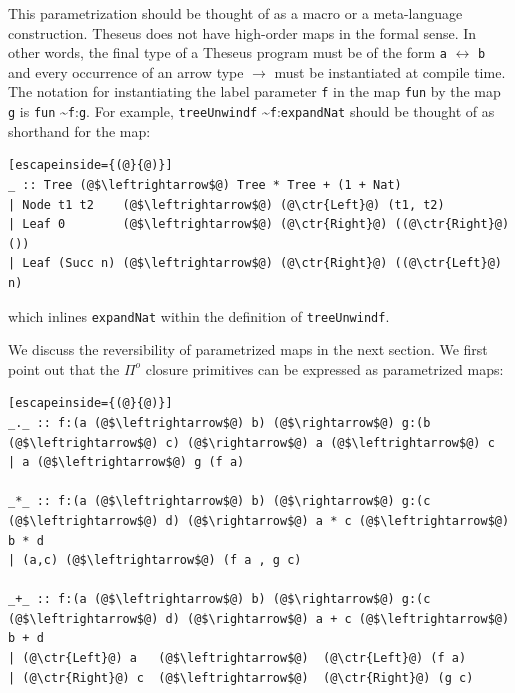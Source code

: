 \documentclass{article}
\newcommand{\ctr}[1]{{\scriptsize{\texttt{#1}}}}
\newcommand{\inline}[3]{\ctr{#1} \textasciitilde \ctr{#2}:\ctr{#3}}
\begin{document}
\noindent This parametrization should be thought of as a macro or a
meta-language construction. Theseus does not have high-order maps in the
formal sense. In other words, the final type of a Theseus program must be of
the form \ctr{a} $\leftrightarrow$ \ctr{b} and every occurrence of an arrow
type $\rightarrow$ must be instantiated at compile time. The notation for
instantiating the label parameter \ctr{f} in the map \ctr{fun} by the map
\ctr{g} is \inline{fun}{f}{g}. For example,
\inline{treeUnwindf}{f}{expandNat} should be thought of as shorthand for the
map:
\begin{lstlisting}[escapeinside={(@}{@)}]
_ :: Tree (@$\leftrightarrow$@) Tree * Tree + (1 + Nat)
| Node t1 t2    (@$\leftrightarrow$@) (@\ctr{Left}@) (t1, t2)
| Leaf 0        (@$\leftrightarrow$@) (@\ctr{Right}@) ((@\ctr{Right}@) ())
| Leaf (Succ n) (@$\leftrightarrow$@) (@\ctr{Right}@) ((@\ctr{Left}@) n)
 \end{lstlisting}

\noindent which inlines \ctr{expandNat} within the definition of
\ctr{treeUnwindf}.

We discuss the reversibility of parametrized maps in the next section. We
first point out that the \ensuremath{\Pi^{o}} closure primitives can be expressed as
parametrized maps:
\begin{lstlisting}[escapeinside={(@}{@)}]
_._ :: f:(a (@$\leftrightarrow$@) b) (@$\rightarrow$@) g:(b (@$\leftrightarrow$@) c) (@$\rightarrow$@) a (@$\leftrightarrow$@) c
| a (@$\leftrightarrow$@) g (f a)

_*_ :: f:(a (@$\leftrightarrow$@) b) (@$\rightarrow$@) g:(c (@$\leftrightarrow$@) d) (@$\rightarrow$@) a * c (@$\leftrightarrow$@) b * d
| (a,c) (@$\leftrightarrow$@) (f a , g c)

_+_ :: f:(a (@$\leftrightarrow$@) b) (@$\rightarrow$@) g:(c (@$\leftrightarrow$@) d) (@$\rightarrow$@) a + c (@$\leftrightarrow$@) b + d
| (@\ctr{Left}@) a   (@$\leftrightarrow$@)  (@\ctr{Left}@) (f a)
| (@\ctr{Right}@) c  (@$\leftrightarrow$@)  (@\ctr{Right}@) (g c)
 \end{lstlisting}
\end{document}
